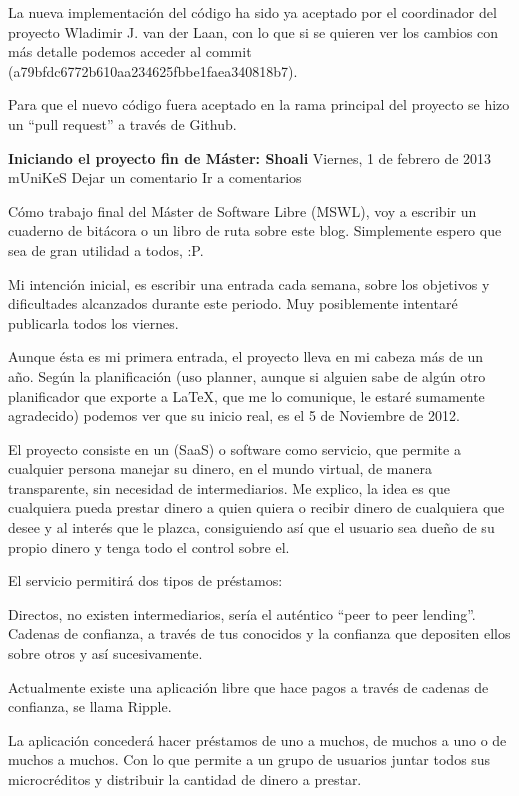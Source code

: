 \documentclass[a4paper, 12pt]{book}
\begin{document}
La nueva implementación del código ha sido ya aceptado por el coordinador del proyecto Wladimir J. van der Laan, con lo que si se quieren ver los cambios con más detalle podemos acceder al commit (a79bfdc6772b610aa234625fbbe1faea340818b7).

Para que el nuevo código fuera aceptado en la rama principal del proyecto se hizo un “pull request” a través de Github.

\textbf{Iniciando el proyecto fin de Máster: Shoali}
Viernes, 1 de febrero de 2013 mUniKeS   Dejar un comentario Ir a comentarios

Cómo trabajo final del Máster de Software Libre (MSWL), voy a escribir un cuaderno de  bitácora o un libro de ruta sobre este blog. Simplemente espero que sea de gran utilidad a todos, :P.

Mi intención inicial, es escribir una entrada cada semana,  sobre los objetivos y dificultades alcanzados durante este periodo. Muy posiblemente intentaré publicarla todos los viernes.

Aunque ésta es mi primera entrada, el proyecto lleva en mi cabeza más de un año. Según la planificación (uso planner, aunque si alguien sabe de algún otro planificador que exporte a LaTeX, que me lo comunique, le estaré sumamente agradecido) podemos ver que su inicio real, es el 5 de  Noviembre de 2012.

El proyecto consiste en un (SaaS) o software como servicio, que permite a cualquier persona manejar su dinero, en el mundo virtual,  de manera transparente, sin necesidad de intermediarios. Me explico, la idea es que cualquiera pueda prestar dinero a quien quiera o recibir dinero de cualquiera que desee y al interés que le plazca, consiguiendo así que el usuario sea dueño de su propio dinero y tenga todo el control sobre el.

El servicio permitirá dos tipos de préstamos:

    Directos,  no existen intermediarios, sería el auténtico “peer to peer lending”.
    Cadenas de confianza, a través de tus conocidos y la confianza que depositen ellos sobre otros y así sucesivamente.

Actualmente existe una aplicación libre que hace pagos a través de cadenas de confianza, se llama Ripple.

La aplicación concederá hacer préstamos de uno a muchos, de muchos a uno o de muchos a muchos. Con lo que permite a un grupo de usuarios juntar todos sus microcréditos y distribuir la cantidad de dinero a prestar.
\end{document}
